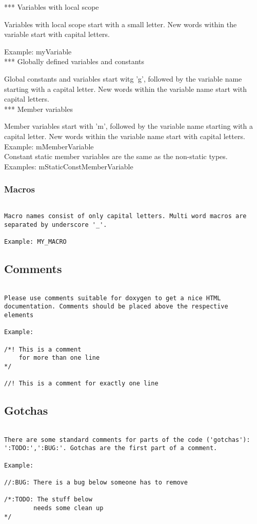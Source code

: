*** Variables with local scope 

Variables with local scope start with a small letter. New words
within the variable start with capital letters.

Example: myVariable
\\

*** Globally defined variables and constants

Global constants and variables start witg 'g', followed by the
variable name starting with a capital letter. New words within the
variable name start with capital letters.
\\

*** Member variables

Member variables start with 'm', followed by the variable name
starting with a capital letter. New words within the variable name
start with capital letters.
\\

Example: mMemberVariable
\\

Constant static member variables are the same as the
non-static types. 
\\

Examples: mStaticConstMemberVariable

\subsubsection{Macros}
\begin{verbatim}

Macro names consist of only capital letters. Multi word macros are
separated by underscore '_'.

Example: MY_MACRO

\end{verbatim}
\subsection{Comments}
\begin{verbatim}

Please use comments suitable for doxygen to get a nice HTML
documentation. Comments should be placed above the respective
elements

Example:

/*! This is a comment 
    for more than one line
*/

//! This is a comment for exactly one line

\end{verbatim}
\subsection{Gotchas}
\begin{verbatim}

There are some standard comments for parts of the code ('gotchas'): 
':TODO:',':BUG:'. Gotchas are the first part of a comment.

Example:

//:BUG: There is a bug below someone has to remove

/*:TODO: The stuff below
        needs some clean up
*/

\end{verbatim}
